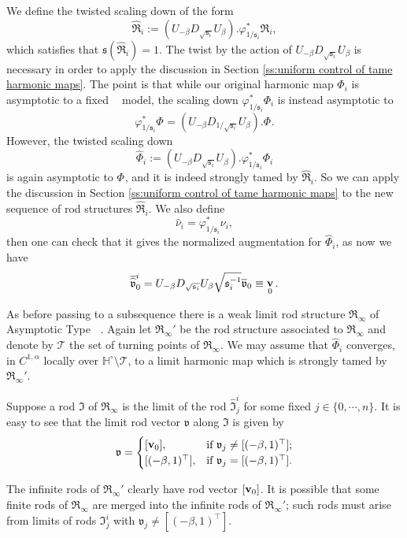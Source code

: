 \documentclass[a4paper,11pt]{amsart}
\theoremstyle{definition}
\numberwithin{equation}{section}
\newcommand{\dH}{\mathbb{H}}
\newcommand{\mv} {\mathfrak v}
\newcommand{\ms} {\mathfrak s}
\newcommand{\mI} {\mathfrak I}
\newcommand{\mR} {\mathfrak R}
\DeclareMathOperator{\bv}{{\bf v}}
\DeclareMathOperator{\AFa}{AF_\beta}
\begin{document}
We define the twisted scaling  down of the form $$\widehat{\mR}_i:=(U_{-\beta}D_{\sqrt{\ms_i}}U_{\beta}).\varphi_{1/\ms_i}^*\mR_i,$$ which satisfies that $\ms(\widehat{\mR}_i)=1$.  The twist by the action of $U_{-\beta} D_{\sqrt{\ms_i}}U_\beta$ is necessary in order to apply the discussion in Section \ref{ss:uniform control of tame harmonic maps}. The point is that while our original harmonic map $\Phi_i$ is asymptotic to a fixed $\AFa$ model, the scaling down $\varphi_{1/\ms_i}^*\Phi_i$ is instead asymptotic to $$\varphi_{1/\ms_i}^*\Phi^{\AFa}=(U_{-\beta}D_{1/\sqrt{\ms_i}}U_{\beta}). \Phi^{\AFa}.$$ However, the twisted scaling down  $$\widehat{\Phi}_i:=(U_{-\beta}D_{\sqrt{\ms_i}}U_{\beta}).\varphi_{1/\ms_i}^*\Phi_i$$ is again asymptotic to $\Phi^{\AFa}$, and it is indeed strongly tamed by $\widehat{\mR}_i$. So we can apply the discussion in Section \ref{ss:uniform control of tame harmonic maps} to the new sequence of rod structures $\widehat{\mR}_i$. We also define $$\widehat{\nu}_i=\varphi_{1/\ms_i}^*\nu_i,$$ then one can check that it gives the normalized augmentation for $\widehat{\Phi}_i$, as now we have 
$$\overline{\widehat{\mv}}_0^i=U_{-\beta}D_{\sqrt{\ms_i}}U_\beta\sqrt{\ms_i^{-1}}\overline{\mv}_0\equiv\bv_0.$$

As before passing to a subsequence there is a weak limit rod structure $\mR_\infty$ of  Asymptotic Type  $\AFa$. Again let $\mR_\infty'$ be the rod structure associated to $\mR_\infty$ and denote by $\mathcal T$ the set of turning points of $\mR_\infty$. We may assume that $\widehat\Phi_i$ converges, in $C^{1, \alpha}$ locally over $\dH^\circ\setminus \mathcal T$, to a limit harmonic map which is strongly tamed by $\mR_\infty'$.



Suppose a rod $\mI$ of $\mR_\infty$ is the limit of the rod $\widehat{\mI}_j^i$ for some fixed $j\in\{0, \cdots, n\}$.  It is easy to see that the limit rod vector $\mv$ along $\mI$ is given by
\begin{equation*}
\mv=\begin{cases}
[\bv_0], &  \text{if} \   \mv_j\neq [(-\beta, 1)^\top];\\
[(-\beta, 1)^\top], & \text{if}\   \mv_j=[(-\beta, 1)^\top].
\end{cases}
\end{equation*}

 The infinite rods of $\mR_\infty'$ clearly have rod vector $[\bv_0]$. It is possible that some finite rods of $\mR_\infty$ are merged into the infinite rods of $\mR_\infty'$; such rods must arise from limits of rods $\mI_j^i$ with $\mv_j\neq [(-\beta, 1)^\top]$. 
\end{document}
